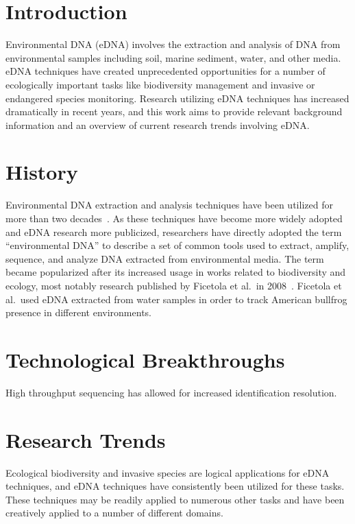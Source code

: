 \documentclass[letterpaper, 10pt, hidelinks]{article}
\begin{document}
\section{Introduction}

Environmental DNA (eDNA) involves the extraction and analysis of DNA from environmental samples including 
soil, marine sediment, water, and other media. eDNA techniques have created unprecedented opportunities for 
a number of ecologically important tasks like biodiversity management and invasive or endangered species 
monitoring. 
Research utilizing eDNA techniques has increased dramatically in recent years, and this work 
aims to provide relevant background information and an overview of current research trends involving 
eDNA.

\section{History}

Environmental DNA extraction and analysis techniques have been utilized for more than two 
decades~\cite{Paul1990, Trevors1989, Somerville1989}. As these techniques have become more widely 
adopted and eDNA research more publicized, researchers have directly adopted the term 
``environmental DNA'' to describe a set of common tools used to extract, amplify, sequence, and 
analyze DNA extracted from environmental media. The term became popularized after its 
increased usage in works related to biodiversity and ecology, most notably research published 
by Ficetola et al.\ in 2008~\cite{Ficetola2008}. Ficetola et al.\ used eDNA extracted from 
water samples in order to track American bullfrog presence in different environments.

\section{Technological Breakthroughs}

High throughput sequencing has allowed for increased identification resolution.

\section{Research Trends}

Ecological biodiversity and invasive species are logical applications for eDNA techniques, and 
eDNA techniques have consistently been utilized for these tasks. These techniques may be 
readily applied to numerous other tasks and have been creatively applied to 
a number of different domains. 
\end{document}
